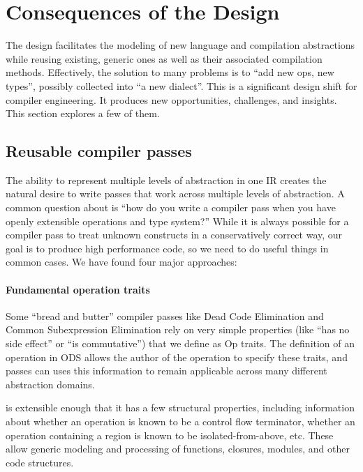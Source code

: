 \section{Consequences of the \MLIR Design}

The \MLIR design facilitates the modeling of new language and compilation abstractions while reusing existing, generic ones as well as their associated compilation methods. Effectively,
the solution to many problems is to ``add new ops, new types'', possibly collected into
``a new dialect''.  This is a significant design shift for compiler engineering.
It produces new opportunities, challenges, and insights.  This section
explores a few of them.

\subsection{Reusable compiler passes}
\label{sec:reusable_passes}

The ability to represent multiple levels of abstraction in one IR creates the
natural desire to write passes that work across multiple levels of abstraction. A
common question about \MLIR is ``how do you write a compiler pass when you have
openly extensible operations and type system?'' While it is always possible
for a compiler pass to treat unknown constructs in a conservatively correct
way, our goal is to produce high performance code, so we need to do
useful things in common cases. We have found four major approaches:

\paragraph{Fundamental operation traits}

Some ``bread and butter'' compiler passes like Dead Code Elimination and Common
Subexpression Elimination rely on very simple properties (like ``has no
side effect'' or ``is commutative'') that we define as Op traits.  The definition
of an operation in ODS allows the author of the operation to specify these
traits, and passes can uses this information to remain applicable
across many different abstraction domains.

\MLIR is extensible enough that it has a few structural properties, including
information about whether an operation is known to be a control flow terminator,
whether an operation containing a region is known to be isolated-from-above, etc.
These allow generic modeling and
processing of functions, closures, modules, and other code structures.

